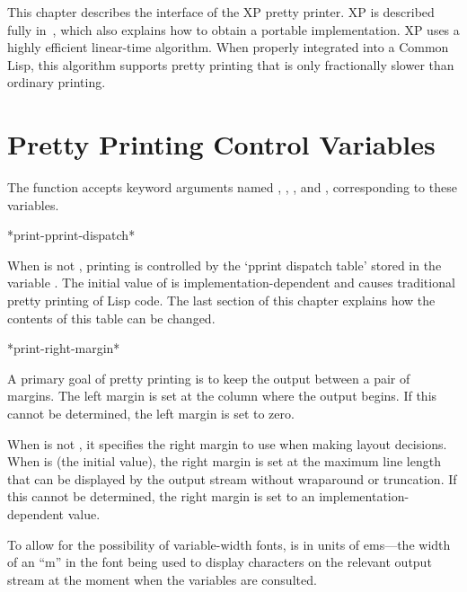 
\beforenoterule
\begin{implementation}
This chapter describes the interface of
the XP pretty printer.  XP is described fully
in~\cite{XP-PRETTY-PRINTER},
which also explains how to obtain a portable implementation.  XP uses
a highly efficient linear-time algorithm.  When properly integrated into a
Common Lisp, this algorithm supports pretty printing that is only
fractionally slower than ordinary printing.
\end{implementation}
\afternoterule

\section{Pretty Printing Control Variables}
\label{PPRINT-VARIABLES-SECTION}

The function  accepts keyword arguments named
, , , and ,
corresponding to these variables.

\begin{defun}[Variable]
*print-pprint-dispatch*

When  is not , printing is controlled by the `pprint
dispatch table' stored in the variable .  The
initial value of  is implementation-dependent and
causes traditional pretty printing of Lisp code.  The last section of this
chapter explains how the contents of this table can be changed.
\end{defun}

\begin{defun}[Variable]
*print-right-margin*

A primary goal of pretty printing is to keep the output between a pair of
margins.  The left margin is set at the column where the output begins.  If
this cannot be determined, the left margin is set to zero.

When  is not , it specifies the right
margin to use when making layout decisions.  When 
is  (the initial value), the right margin is set at the maximum
line length that can be displayed by the output stream without wraparound
or truncation.  If this cannot be determined, the right margin is set to an
implementation-dependent value.

To allow for the possibility of variable-width fonts,
 is in units of ems---the width of an
``m'' in the font being used to display characters on the relevant output
stream at the moment when the variables are consulted.
\end{defun}

